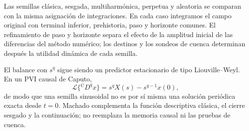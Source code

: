 Las semillas clásica, sesgada, multiharmónica, perpetua y aleatoria se
comparan con la misma asignación de integraciones. En cada caso integramos
el campo original con terminal inferior, prehistoria, paso y horizonte
comunes. El refinamiento de paso y horizonte separa el efecto de la amplitud
inicial de las diferencias del método numérico; los destinos y los sondeos
de cuenca determinan después la utilidad dinámica de cada semilla.

El balance con \(s^q\) sigue siendo un predictor estacionario de tipo
Liouville--Weyl. En un PVI causal de Caputo,
\[
 \mathcal L\{{}^{\mathrm C}D^qx\}
 =s^qX(s)-s^{q-1}x(0),
\]
de modo que una semilla sinusoidal no es por sí misma una solución periódica
exacta desde \(t=0\). Machado complementa la función descriptiva clásica, el
cierre sesgado y la continuación; no reemplaza la memoria causal ni las
pruebas de cuenca.
